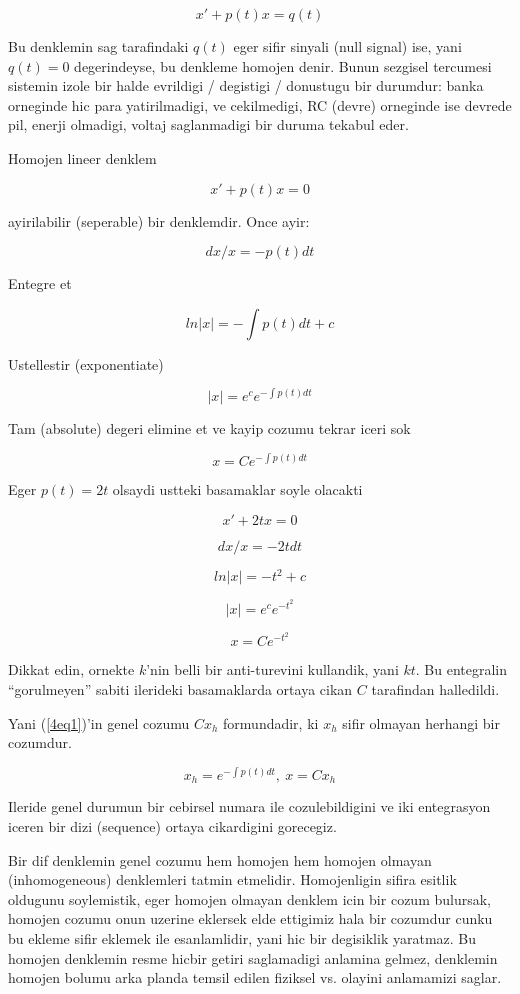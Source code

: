 \documentclass[12pt,fleqn]{article}
\begin{document}
\[ x' + p(t)x = q(t) \]

Bu denklemin sag tarafindaki $q(t)$ eger sifir sinyali (null signal) ise,
yani $q(t) = 0$ degerindeyse, bu denkleme homojen denir. Bunun sezgisel
tercumesi sistemin izole bir halde evrildigi / degistigi / donustugu bir
durumdur: banka orneginde hic para yatirilmadigi, ve cekilmedigi, RC
(devre) orneginde ise devrede pil, enerji olmadigi, voltaj saglanmadigi bir
duruma tekabul eder. 

Homojen lineer denklem

\begin{equation}\label{4eq1}
x' + p(t) x = 0 
\end{equation}

ayirilabilir (seperable) bir denklemdir. Once ayir:

\[ dx/x = - p(t) dt \]

Entegre et

\[ ln|x| = - \int p(t) dt + c \]

Ustellestir (exponentiate)

\[ |x| = e^c e^{ - \int p(t) dt } \]

Tam (absolute) degeri elimine et ve kayip cozumu tekrar iceri sok

\[ x = C e^{- \int p(t) dt} \]

Eger $p(t) = 2t$ olsaydi ustteki basamaklar soyle olacakti

\[ x' + 2tx = 0 \]

\[ dx/x = - 2t dt \]

\[ ln|x| = - t^2 + c \]

\[ |x| = e^c e^{-t^2} \]

\[ x = C e^{-t^2} \]

Dikkat edin, ornekte $k$'nin belli bir anti-turevini kullandik, yani
$kt$. Bu entegralin ``gorulmeyen'' sabiti ilerideki basamaklarda ortaya
cikan $C$ tarafindan halledildi. 

Yani (\ref{4eq1})'in genel cozumu $C x_h$ formundadir, ki $x_h$ sifir
olmayan herhangi bir cozumdur. 

\[ x_h = e^{- \int p(t) dt} , \ x = C x_h \]

Ileride genel durumun bir cebirsel numara ile cozulebildigini ve iki
entegrasyon iceren bir dizi (sequence) ortaya cikardigini gorecegiz. 

Bir dif denklemin genel cozumu hem homojen hem homojen olmayan
(inhomogeneous) denklemleri tatmin etmelidir. Homojenligin sifira esitlik
oldugunu soylemistik, eger homojen olmayan denklem icin bir cozum bulursak,
homojen cozumu onun uzerine eklersek elde ettigimiz hala bir cozumdur cunku
bu ekleme sifir eklemek ile esanlamlidir, yani hic bir degisiklik
yaratmaz. Bu homojen denklemin resme hicbir getiri saglamadigi anlamina
gelmez, denklemin homojen bolumu arka planda temsil edilen fiziksel
vs. olayini anlamamizi saglar.
\end{document}
